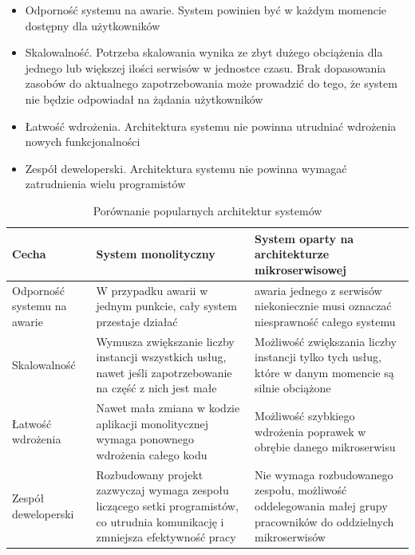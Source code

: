 \documentclass[11pt, a4]{article} %
\begin{document}
\begin{itemize} %
    \item Odporność systemu na awarie. System powinien być w każdym momencie dostępny 
    dla użytkowników
    \item Skalowalność. Potrzeba skalowania wynika ze zbyt dużego obciążenia dla jednego 
    lub większej ilości serwisów w jednostce czasu. Brak dopasowania zasobów do 
    aktualnego zapotrzebowania może prowadzić do tego, że system nie będzie odpowiadał 
    na żądania użytkowników
    \item Łatwość wdrożenia. Architektura systemu nie powinna utrudniać wdrożenia nowych 
    funkcjonalności
    \item Zespół deweloperski. Architektura systemu nie powinna wymagać zatrudnienia 
    wielu programistów
\end{itemize}

\begin{table}[!ht]
    \caption{Porównanie popularnych architektur systemów}
    \label{tab:porownanie-architektur}
    \begin{tabularx}{1\textwidth} { 
        | >{\raggedright\arraybackslash}X 
        | >{\centering\arraybackslash}X 
        | >{\raggedleft\arraybackslash}X | }
        \hline
       Cecha & System monolityczny & System oparty na architekturze mikroserwisowej \\
        \hline
       Odporność systemu na awarie & 
       W przypadku awarii w jednym punkcie, cały system przestaje działać & 
       awaria jednego z serwisów niekoniecznie musi oznaczać niesprawność całego systemu \\
       \hline
       Skalowalność & 
       Wymusza zwiększanie liczby instancji wszystkich usług, nawet jeśli zapotrzebowanie 
       na część z nich jest małe & 
       Możliwość zwiększania liczby instancji tylko tych usług, które w danym momencie są 
       silnie obciążone \\
      \hline
      Łatwość wdrożenia &
      Nawet mała zmiana w kodzie aplikacji monolitycznej wymaga ponownego wdrożenia całego 
      kodu &
      Możliwość szybkiego wdrożenia poprawek w obrębie danego mikroserwisu \\
      \hline
      Zespół deweloperski &
      Rozbudowany projekt zazwyczaj wymaga zespołu liczącego setki programistów, co 
      utrudnia komunikację i zmniejsza efektywność pracy &
      Nie wymaga rozbudowanego zespołu, możliwość oddelegowania małej grupy pracowników 
      do oddzielnych mikroserwisów \\
      \hline
    \end{tabularx}
\end{table}
\end{document}
